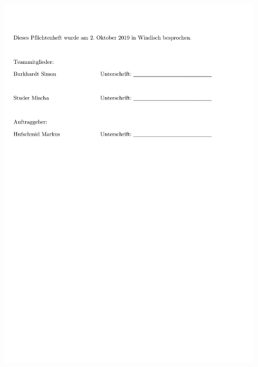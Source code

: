 \begin{appendix}
\begin{figure}[h]
	\centering
	\includegraphics[width=0.95\linewidth]{appendix/pflichtenheft(6).pdf}
\end{figure}


\end{appendix}







